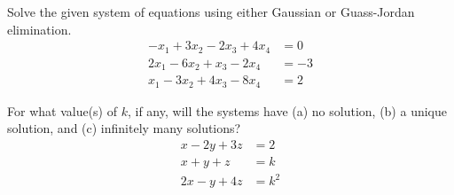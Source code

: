 \documentclass[12pt,letterpaper]{hmcpset}
\begin{document}
\begin{solution}
\vfill
\end{solution}
\newpage

\begin{problem}[2.2.30]

Solve the given system of equations using either Gaussian or Guass-Jordan elimination.
	\begin{align*}
		-x_1 + 3x_2 - 2x_3 + 4x_4 &= 0\\
		2x_1 - 6x_2 + x_3 - 2x_4 &= -3\\
		x_1 - 3x_2 + 4x_3 - 8x_4 &= 2
	\end{align*}
	
\end{problem}

\begin{solution}
\vfill
\end{solution}
\newpage

\begin{problem}[2.2.42]

For what value(s) of $k$, if any, will the systems have (a) no solution, (b) a unique solution, and (c) infinitely many solutions?
	\begin{align*}
		x - 2y + 3z &= 2\\
		x + y + z &= k\\
		2x - y + 4z &= k^2
	\end{align*}
\end{problem}

\begin{solution}
\vfill
\end{solution}
\end{document}

